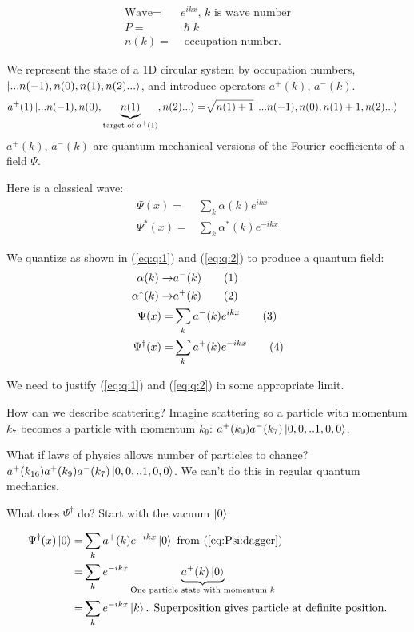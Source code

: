 \documentclass[]{article}
\newcommand\numberthis{\addtocounter{equation}{1}\tag{\theequation}}
\begin{document}
\begin{align*}
	\text{Wave} =& e^{i k x} \text{, $k$ is wave number}\\
	P=&\hslash k\\
	n(k) =& \text{ occupation number.}
\end{align*}

We represent the state of a 1D circular system by occupation numbers, $\ket{...n(-1), n(0), n(1), n(2)...}$, and introduce operators $a^+(k)$, $a^-(k)$. 
\begin{align*}
a^+(1)\ket{...n(-1), n(0), \underbrace{n(1)}_\text{target of $a^+(1)$}, n(2)...}=& \sqrt{n(1)+1}\ket{...n(-1), n(0), n(1)+1, n(2)...}
\end{align*}
$a^+(k)$, $a^-(k)$ are quantum mechanical versions of the Fourier coefficients of a field $\Psi$.

Here is a classical wave:
\begin{align*}
	\Psi(x) =& \sum_k \alpha(k) e^{ikx}\\
	\Psi^*(x) =& \sum_k \alpha^*(k) e^{-ikx}
\end{align*}

We quantize as shown in (\ref{eq:q:1}) and (\ref{eq:q:2}) to produce a quantum field:
\begin{align*}
	\alpha(k) \rightarrow& a^-(k) \numberthis \label{eq:q:1}\\
	\alpha^*(k) \rightarrow& a^+(k) \numberthis \label{eq:q:2}\\
	\Psi(x) =& \sum_k a^-(k) e^{ikx} \numberthis \label{eq:Psi}\\
	\Psi^\dagger(x) =& \sum_k a^+(k) e^{-ikx} \numberthis \label{eq:Psi:dagger}
\end{align*}

We need to justify (\ref{eq:q:1}) and (\ref{eq:q:2}) in some appropriate limit.

How can we describe scattering? Imagine scattering so a particle with momentum $k_7$ becomes a particle with momentum $k_9$: $a^+(k_9)a^-(k_7)\ket{0,0,..1,0,0}$.

What if laws of physics allows number of particles to change? $a^+(k_{16})a^+(k_9)a^-(k_7)\ket{0,0,..1,0,0}$. We can't do this in regular quantum mechanics.

What does $\Psi^\dagger$ do? Start with the vacuum $\ket{0}$.

\begin{align*}
	\Psi^\dagger(x)\ket{0} =& \sum_k a^+(k) e^{-ikx} \ket{0} \text{ from (\ref{eq:Psi:dagger})}\\
	=& \sum_k e^{-ikx} \underbrace{a^+(k) \ket{0}}_\text{One particle state with momentum $k$} \\
	=& \sum_k e^{-ikx} \ket{k} \text{. Superposition gives particle at definite position.}
\end{align*}
\end{document}
